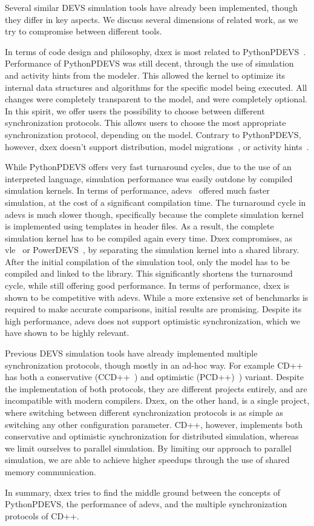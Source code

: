 Several similar \textsf{DEVS} simulation tools have already been implemented, though they differ in key aspects.
We discuss several dimensions of related work, as we try to compromise between different tools.

In terms of code design and philosophy, dxex is most related to PythonPDEVS~\cite{PythonPDEVS}.
Performance of PythonPDEVS was still decent, through the use of simulation and activity hints from the modeler.
This allowed the kernel to optimize its internal data structures and algorithms for the specific model being executed.
All changes were completely transparent to the model, and were completely optional.
In this spirit, we offer users the possibility to choose between different synchronization protocols.
This allows users to choose the most appropriate synchronization protocol, depending on the model.
Contrary to PythonPDEVS, however, dxex doesn't support distribution, model migrations~\cite{PythonPDEVS2}, or activity hints~\cite{PythonPDEVS_ACTIMS}.

While PythonPDEVS offers very fast turnaround cycles, due to the use of an interpreted language, simulation performance was easily outdone by compiled simulation kernels.
In terms of performance, adevs~\cite{adevs} offered much faster simulation, at the cost of a significant compilation time.
The turnaround cycle in adevs is much slower though, specifically because the complete simulation kernel is implemented using templates in header files.
As a result, the complete simulation kernel has to be compiled again every time.
Dxex compromises, as vle~\cite{vle} or PowerDEVS~\cite{PowerDEVS}, by separating the simulation kernel into a shared library.
After the initial compilation of the simulation tool, only the model has to be compiled and linked to the library.
This significantly shortens the turnaround cycle, while still offering good performance.
In terms of performance, dxex is shown to be competitive with adevs.
While a more extensive set of benchmarks is required to make accurate comparisons, initial results are promising.
Despite its high performance, adevs does not support optimistic synchronization, which we have shown to be highly relevant.

Previous \textsf{DEVS} simulation tools have already implemented multiple synchronization protocols, though mostly in an ad-hoc way.
For example CD++~\cite{CD++} has both a conservative (CCD++~\cite{CCD++}) and optimistic (PCD++)~\cite{PCD++}) variant.
Despite the implementation of both protocols, they are different projects entirely, and are incompatible with modern compilers.
Dxex, on the other hand, is a single project, where switching between different synchronization protocols is as simple as switching any other configuration parameter.
CD++, however, implements both conservative and optimistic synchronization for distributed simulation, whereas we limit ourselves to parallel simulation.
By limiting our approach to parallel simulation, we are able to achieve higher speedups through the use of shared memory communication.

In summary, dxex tries to find the middle ground between the concepts of PythonPDEVS, the performance of adevs, and the multiple synchronization protocols of CD++.
